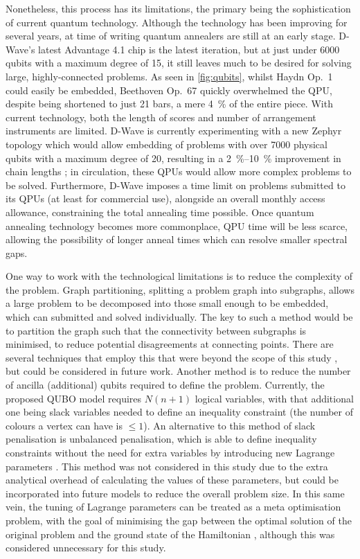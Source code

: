 \documentclass[12pt]{article}
\theoremstyle{definition}
\begin{document}
Nonetheless, this process has its limitations, the primary being the sophistication of current quantum technology. Although the technology has been improving for several years, at time of writing quantum annealers are still at an early stage. D-Wave's latest Advantage 4.1 chip is the latest iteration, but at just under \num{6000} qubits with a maximum degree of \num{15}, it still leaves much to be desired for solving large, highly-connected problems. As seen in \cref{fig:qubits}, whilst Haydn Op.\ 1 could easily be embedded, Beethoven Op.\ 67 quickly overwhelmed the QPU, despite being shortened to just \num{21} bars, a mere \qty{4}{\%} of the entire piece. With current technology, both the length of scores and number of arrangement instruments are limited. D-Wave is currently experimenting with a new Zephyr topology which would allow embedding of problems with over \num{7000} physical qubits with a maximum degree of \num{20}, resulting in a \qtyrange{2}{10}{\%} improvement in chain lengths \cite{dwave_zephyr}; in circulation, these QPUs would allow more complex problems to be solved.
Furthermore, D-Wave imposes a time limit on problems submitted to its QPUs (at least for commercial use), alongside an overall monthly access allowance, constraining the total annealing time possible. Once quantum annealing technology becomes more commonplace, QPU time will be less scarce, allowing the possibility of longer anneal times which can resolve smaller spectral gaps.

One way to work with the technological limitations is to reduce the complexity of the problem. Graph partitioning, splitting a problem graph into subgraphs, allows a large problem to be decomposed into those small enough to be embedded, which can submitted and solved individually. The key to such a method would be to partition the graph such that the connectivity between subgraphs is minimised, to reduce potential disagreements at connecting points. There are several techniques that employ this that were beyond the scope of this study \cite{dwave_decomposing}, but could be considered in future work.
Another method is to reduce the number of ancilla (additional) qubits required to define the problem. Currently, the proposed QUBO model requires $N(n+1)$ logical variables, with that additional one being slack variables needed to define an inequality constraint (the number of colours a vertex can have is $\le1$). An alternative to this method of slack penalisation is unbalanced penalisation, which is able to define inequality constraints without the need for extra variables by introducing new Lagrange parameters \cite{montanez-barrera_unbalanced_2024}. This method was not considered in this study due to the extra analytical overhead of calculating the values of these parameters, but could be incorporated into future models to reduce the overall problem size. In this same vein, the tuning of Lagrange parameters can be treated as a meta optimisation problem, with the goal of minimising the gap between the optimal solution of the original problem and the ground state of the Hamiltonian \cite{montanez-barrera_unbalanced_2024}, although this was considered unnecessary for this study.
\end{document}
